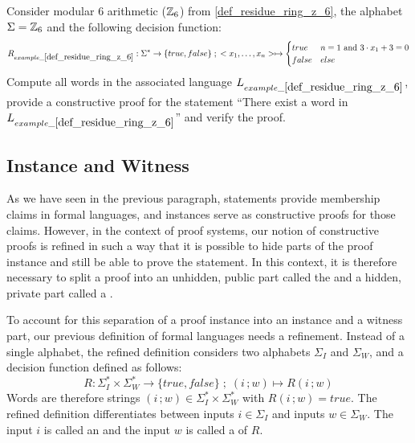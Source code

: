 \begin{exercise} Consider modular $6$ arithmetic ($\mathbb{Z}_6$) from  \examplename{} \ref{def_residue_ring_z_6}, the alphabet $\Sigma = \mathbb{Z}_6$ and the following decision function:
\begin{equation*}
R_{example\_\ref{def_residue_ring_z_6}} : \Sigma^*\to \{true, false\}\;;\;
<x_1,\ldots,x_n> \mapsto
\begin{cases}
true & n=1 \text{ and } 3\cdot x_1 + 3 = 0\\
false & else
\end{cases}
\end{equation*}
Compute all words in the associated language $L_{example\_\ref{def_residue_ring_z_6}}$, provide a constructive proof for the statement ``There exist a word in $L_{example\_\ref{def_residue_ring_z_6}}$'' and verify the proof.
\end{exercise}

\subsection{Instance and Witness}
As we have seen in the previous paragraph, statements provide membership claims in formal languages, and instances serve as constructive proofs for those claims. However, in the context of  proof systems, our notion of constructive proofs is refined in such a way that  it is possible to hide parts of the proof instance and still be able to prove the statement. In this context, it is therefore necessary to split a proof into an unhidden, public part called the  and a hidden, private part called a .

To account for this separation of a proof instance into an instance and a witness part, our previous definition of formal languages needs a refinement. Instead of a single alphabet, the refined definition considers two alphabets $\Sigma_I$ and $\Sigma_W$, and a decision function defined as follows:
\begin{equation}
R: \Sigma_I^* \times \Sigma_W^* \to \{true, false\}\;;\; (i\,;w) \mapsto R(i\,;w)
\end{equation}
Words are therefore strings $(i\,;w)\in \Sigma_I^* \times \Sigma_W^*$ with $R(i\,;w)=true$. The refined definition differentiates between inputs $i\in \Sigma_I$ and inputs $w\in \Sigma_W$. The input $i$ is called an  and the input $w$ is called a  of $R$. 


